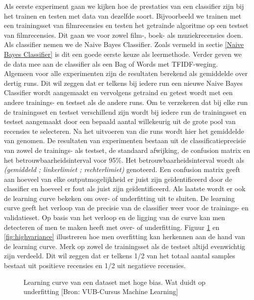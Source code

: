 Als eerste experiment gaan we kijken hoe de prestaties van een classifier zijn bij het trainen en testen met data van dezelfde soort. Bijvoorbeeld we trainen met een trainingsset van filmrecensies en testen het getrainde algoritme op een testset van filmrecensies. Dit gaan we voor zowel film-, boek- als muziekrecensies doen. Als classifier nemen we de Naive Bayes Classifier. Zoals vermeld in sectie \ref{Naive Bayes Classifier} is  dit een goede eerste keuze als leermethode. Verder geven we de data mee aan de classifier als een Bag of Words met TFIDF-weging.\\
%
Algemeen voor alle experimenten zijn de resultaten berekend als gemiddelde over dertig runs. Dit wil zeggen dat er telkens bij iedere run een nieuwe Naive Bayes Classifier wordt aangemaakt en vervolgens getraind en getest wordt met een andere trainings- en testset als de andere runs. Om te verzekeren dat bij elke run de trainingsset en testset verschillend zijn wordt bij iedere run de trainingsset en testset aangemaakt  door een bepaald aantal willekeurig uit de grote pool van recensies te selecteren. Na het uitvoeren van die runs wordt hier het gemiddelde van genomen. De resultaten van experimenten bestaan uit de classificatieprecisie van zowel de trainings- als testset, de standaard afwijking, de confusion matrix en het betrouwbaarheidsinterval voor 95\%. Het betrouwbaarheidsinterval wordt als \textit{(gemiddeld ; linkerlimiet ; rechterlimiet)} genoteerd. Een confusion matrix geeft aan hoeveel van elke outputmogelijkheid er juist zijn ge\"identificeerd door de classifier en hoeveel er fout als juist zijn ge\"identificeerd. Als laatste wordt er ook de learning curve bekeken om over- of underfitting uit te sluiten. De learning curve geeft het verloop van de precisie van de classifier weer voor de trainings- en validatieset. Op basis van het verloop en de ligging van de curve kan men detecteren of men te maken heeft met over- of underfitting. Figuur \ref{fig:highbias} en \ref{fig:highvariance} illustreren hoe men overfitting kan herkennen aan de hand van de learning curve. Merk op zowel de trainingsset als de testset altijd evenwichtig zijn verdeeld. Dit wil zeggen dat er telkens 1/2 van het totaal aantal samples bestaat uit positieve recensies en 1/2 uit negatieve recensies.
\newpage
\begin{figure}[h]
    \centering
    \caption{Learning curve van een dataset met hoge bias. Wat duidt op underfitting [Bron: VUB-Cursus Machine Learning]}
    \label{fig:highbias}
 \end{figure}
